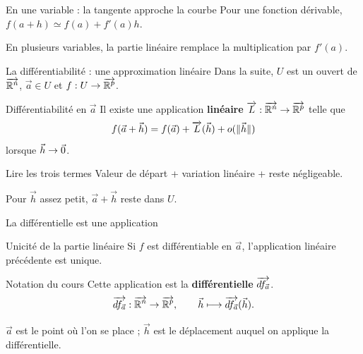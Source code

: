 \begin{frame}[t]{En une variable : la tangente approche la courbe}
\coursanalyse
Pour une fonction dérivable, $f(a+h)\simeq f(a)+f'(a)h$.
\begin{center}\end{center}
\vfill En plusieurs variables, la partie linéaire remplace la multiplication par $f'(a)$.
\end{frame}

\begin{frame}[t]{La différentiabilité : une approximation linéaire}
\coursanalyse
Dans la suite, $U$ est un ouvert de $\overrightarrow{\mathbb R^{n}}$, $\vec a\in U$ et $f:U\to\overrightarrow{\mathbb R^{p}}$.
\begin{notion}{Différentiabilité en $\vec a$}
Il existe une application \textbf{linéaire} $\overrightarrow{L}:\overrightarrow{\mathbb R^{n}}\to\overrightarrow{\mathbb R^{p}}$ telle que
\[f(\vec a+\vec h)=f(\vec a)+\overrightarrow{L}(\vec h)+o(\lVert \vec h\rVert)\]
lorsque $\vec h\to\vec 0$.
\end{notion}
\begin{resultat}{Lire les trois termes}
Valeur de départ \quad + \quad variation linéaire \quad + \quad reste négligeable.
\end{resultat}
\vfill Pour $\vec h$ assez petit, $\vec a+\vec h$ reste dans $U$.
\end{frame}

\begin{frame}[t]{La différentielle est une application}
\coursanalyse
\begin{theoreme}{Unicité de la partie linéaire}
Si $f$ est différentiable en $\vec a$, l'application linéaire précédente est unique.
\end{theoreme}
\begin{notion}{Notation du cours}
Cette application est la \textbf{différentielle} $\overrightarrow{df_{\vec a}}$.
\[\overrightarrow{df_{\vec a}}:\overrightarrow{\mathbb R^{n}}\to\overrightarrow{\mathbb R^{p}},\qquad\vec h\longmapsto\overrightarrow{df_{\vec a}}(\vec h).\]
\end{notion}
\vfill $\vec a$ est le point où l'on se place ; $\vec h$ est le déplacement auquel on applique la différentielle.
\end{frame}

